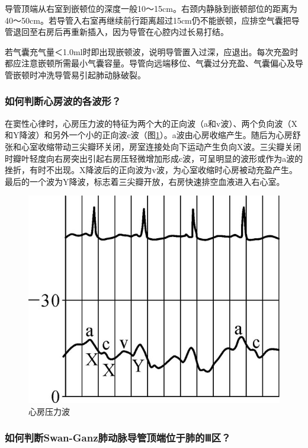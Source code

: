导管顶端从右室到嵌顿位的深度一般10～15cm。右颈内静脉到嵌顿部位的距离为40～50cm。若导管入右室再继续前行距离超过15cm仍不能嵌顿，应排空气囊把导管退回至右房后再重新插入，因为导管在心腔内过长易打结。

若气囊充气量＜1.0ml时即出现嵌顿波，说明导管置入过深，应退出。每次充盈时都应注意嵌顿所需最小气囊容量。导管向远端移位、气囊过分充盈、气囊偏心及导管嵌顿时冲洗导管易引起肺动脉破裂。

\subsubsection{如何判断心房波的各波形？}

在窦性心律时，心房压力波的特征为两个大的正向波（a和v波）、两个负向波（X和Y降波）和另外一个小的正向波c波（图\ref{fig4-6}）。a波由心房收缩产生。随后为心房舒张和心室收缩带动三尖瓣环关闭，房室连接处向下运动产生负向X波。三尖瓣关闭时瓣叶轻度向右房突出引起右房压轻微增加形成c波，可呈明显的波形或作为a波的挫折，有时不出现。X降波后的正向波为v波，为心室收缩时心房被动充盈产生。最后的一个波为Y降波，标志着三尖瓣开放，右房快速排空血液进入右心室。

\begin{figure}[!htbp]
 \centering
 \includegraphics{./images/Image00034.jpg}
 \captionsetup{justification=centering}
 \caption{心房压力波}
 \label{fig4-6}
  \end{figure} 

\subsubsection{如何判断Swan-Ganz肺动脉导管顶端位于肺的Ⅲ区？}

